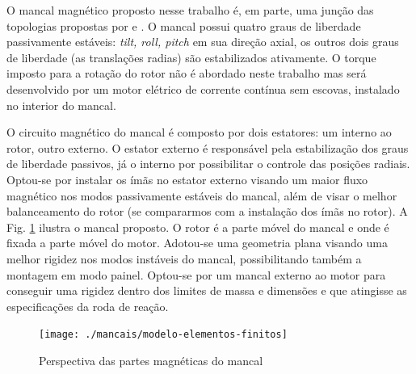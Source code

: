 
O mancal magnético proposto nesse trabalho é, em parte, uma junção das topologias propostas por \citet{Bernus1998} e \citet{Scharfe2001}. O mancal possui quatro graus de liberdade passivamente estáveis: \textit{tilt, roll, pitch} em sua direção axial, os outros dois graus de liberdade (as translações radias) são estabilizados ativamente. O torque imposto para a rotação do rotor não é abordado neste trabalho mas será desenvolvido por um motor elétrico de corrente contínua sem escovas, instalado no interior do mancal.


O circuito magnético do mancal é composto por dois estatores: um interno ao rotor, outro externo. O estator externo é responsável pela estabilização dos graus de liberdade passivos, já o interno por possibilitar o controle das posições radiais. Optou-se por instalar os ímãs no estator externo visando um maior fluxo magnético nos modos passivamente estáveis do mancal, além de visar o melhor balanceamento do rotor (se compararmos com a instalação dos ímãs no rotor). A Fig. \ref{fig:mancal:topo} ilustra o mancal proposto. O rotor é a parte móvel do mancal e onde é fixada a parte móvel do motor. Adotou-se uma geometria plana visando uma melhor rigidez nos modos instáveis do mancal, possibilitando também a montagem em modo painel. Optou-se por um mancal externo ao motor para conseguir uma rigidez dentro dos limites de massa e dimensões e que atingisse as especificações  da roda de reação. 


\begin{figure}[ht!]
\centering
\texttt{[image: ./mancais/modelo-elementos-finitos]}
\caption[Corte ilustrativo do mancal magnético]{Perspectiva das partes magnéticas do mancal}
\label{fig:mancal:topo}
\end{figure}

